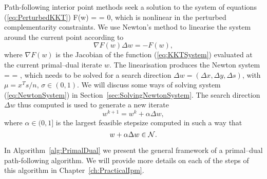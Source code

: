 Path-following interior point methods seek a solution 
to the system of equations (\ref{eq:PerturbedKKT})
\be  \label{eq:KKTSystem}
F(w) =  = 0,
\ee
which is nonlinear in the perturbed complementarity constraints.
We use Newton's method to linearise the system around the 
current point according to
\[
  \nabla F(w) \Delta w = -F(w),
\]
where $\nabla F(w)$ is the Jacobian of the function (\ref{eq:KKTSystem})
evaluated at the current primal--dual iterate $w$.
The linearisation produces the Newton system 
%
\be \label{eq:NewtonSystem}
 =
 =
\left[ \begin{array}{c}
    \xi_b \\ \xi_c \\ \xi_\mu
   \end{array} \right],
\ee
%
which needs to be solved for a search direction
$\Delta w = (\Delta x, \Delta y, \Delta s)$,
with $\mu = x^Ts/n$, $\sigma \in (0,1)$.
We will discuss some ways of solving system (\ref{eq:NewtonSystem})
in Section~\ref{sec:SolvingNewtonSystem}.
The search direction $\Delta w$ thus computed is used to generate 
a new iterate
\[
  w^{k+1} = w^k + \alpha\Delta w,
\]
where $\alpha \in (0,1]$ is the largest feasible stepsize computed in
such a way that
\[
   w + \alpha \Delta w \in \mathcal{N}.
\]

In Algorithm~\ref{alg:PrimalDual} we present the general framework of a 
primal--dual path-following algorithm.
We will provide more details on each of the steps of this algorithm
in Chapter~\ref{ch:PracticalIpm}.

